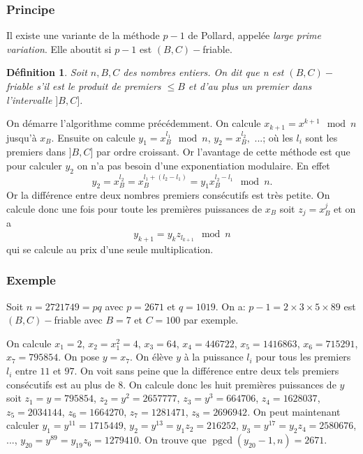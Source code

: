 \documentclass[french, 12pt, titlepage]{article}
\DeclareMathOperator{\pgcd}{pgcd}
\newtheorem{definition}{D{\'e}finition}
\begin{document}
\subsubsection{Principe}
Il existe une variante de la méthode $p - 1$ de Pollard, appelée \textit{large prime variation}. 
Elle aboutit si $p - 1$ est $(B, C)-$friable.

\begin{definition}
  Soit $n, B, C$ des nombres entiers. On dit que n est $(B, C)-$friable s'il est le produit de premiers $\leq B$ et d'au plus un premier dans l'intervalle $]B, C]$.
\end{definition}
On démarre l'algorithme comme précédemment. On calcule $x_{k + 1} = x^{k + 1} \mod n$ jusqu'à $x_B.$ Ensuite on calcule $y_1 = x_B^{l_1} \mod n$, $y_2 = x_B^{l_2},$ ...; où les $l_i$ sont les premiers dans $]B,C]$ par ordre croissant.
Or l'avantage de cette méthode est que pour calculer $y_2$ on n'a pas besoin d'une exponentiation modulaire. En effet \[ y_2 = x_B^{l_2} = x_B^{l_1 + (l_2 - l_1)} = y_1 x_B^{l_2 - l_1} \mod n.\]
Or la différence entre deux nombres premiers consécutifs est très petite. On calcule donc une fois pour toute les premières puissances de $x_B$ soit $z_j = x_B^j$ et on a \[ y_{k + 1} = y_k z_{l_{k+1}} \mod n \] qui se calcule au prix d'une seule multiplication.
\subsubsection{Exemple}

Soit $n = 2721749 = pq$ avec $p = 2671$ et $q = 1019$. On a: $p - 1 = 2 \times 3 \times 5 \times 89$ est $(B, C)-$friable avec $B = 7$ et $C = 100$ par exemple.

On calcule $x_1 = 2$, $x_2 = x_1^2 = 4$, $x_3 = 64$, $x_4 = 446722$, $x_5 = 1416863$, $x_6 = 715291$, $x_7 = 795854$.
On pose $y = x_7$. On élève $y$ à la puissance $l_i$ pour tous les premiers $l_i$ entre $11$ et $97$. On voit sans peine que la différence entre deux tels premiers consécutifs est au plus de $8.$
On calcule donc les huit premières puissances de $y$ soit $z_1 = y = 795854$, $z_2 = y^2 = 2657777$, $z_3 = y^3 = 664706$, $z_4 = 1628037$, $z_5 = 2034144$, $z_6 = 1664270$, $z_7 = 1281471$, $z_8 = 2696942$.
On peut maintenant calculer $y_1 = y^{11} = 1715449$, $y_2 = y^{13} = y_1 z_2 = 216252$, $y_3 = y^{17} = y_2 z_4 = 2580676$, ..., $y_{20} = y^{89} = y_{19} z_6 = 1279410.$
On trouve que $ \pgcd (y_{20} - 1, n) = 2671.$
\end{document}

